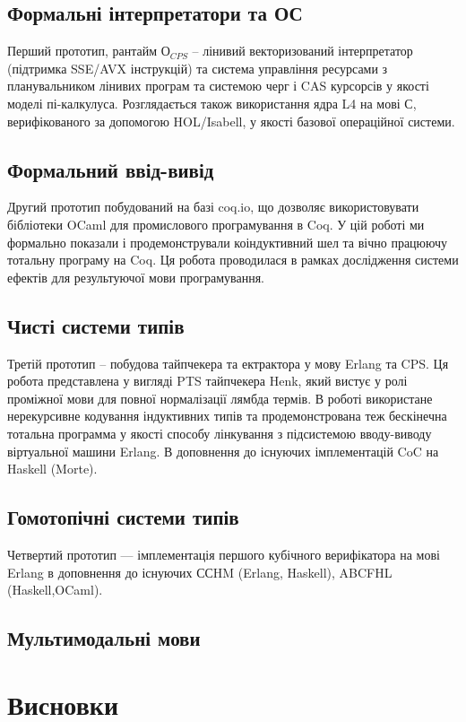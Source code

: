 \subsection{Формальні інтерпретатори та ОС}
Перший прототип, рантайм $О_{CPS}$ -- лінивий
векторизований інтерпретатор (підтримка SSE/AVX інструкцій) та система
управління ресурсами з планувальником лінивих програм
та системою черг і CAS курсорсів у якості моделі пі-калкулуса. Розглядається також
використання ядра L4 на мові С, верифікованого за допомогою HOL/Isabell,
у якості базової операційної системи.

\subsection{Формальний ввід-вивід}
Другий прототип побудований на базі coq.io, що дозволяє
використовувати бібліотеки OCaml для промислового програмування в Coq.
У цій роботі ми формально показали і продемонстрували коіндуктивний шел
та вічно працюючу тотальну програму на Coq. Ця робота проводилася
в рамках дослідження системи ефектів для результуючої мови програмування.

\subsection{Чисті системи типів}
Третій прототип -- побудова тайпчекера та ектрактора у мову Erlang та CPS.
Ця робота представлена у вигляді PTS тайпчекера Henk, який вистує у ролі
проміжної мови для повної нормалізації лямбда термів. В роботі використане
нерекурсивне кодування індуктивних типів та продемонстрована теж бескінечна
тотальна программа у якості способу лінкування з підсистемою вводу-виводу
віртуальної машини Erlang. В доповнення до існуючих імплементацій CoC
на Haskell (Morte).

\subsection{Гомотопічні системи типів}
Четвертий прототип --- імплементація першого кубічного верифікатора на
мові Erlang в доповнення до існуючих ССHM (Erlang, Haskell),
ABCFHL (Haskell,OCaml).

\subsection{Мультимодальні мови}

\newpage
\section{Висновки}

